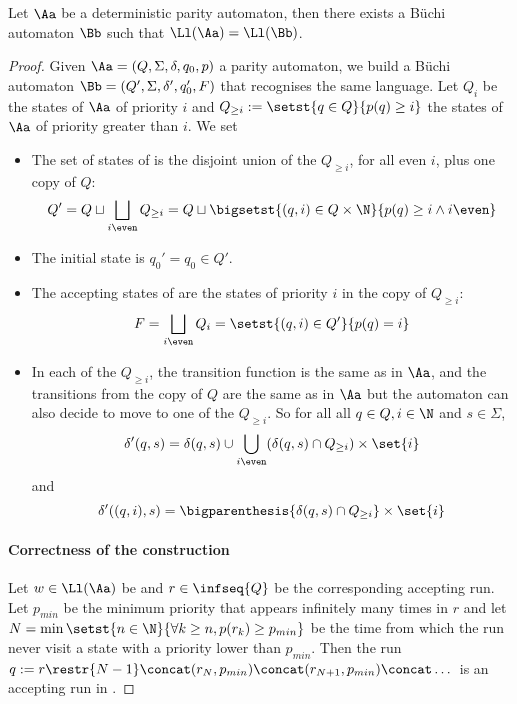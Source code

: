 \begin{lemma}
    Let $\Aa$ be a deterministic parity automaton,
    then there exists a Büchi automaton $\Bb$
    such that $\Ll(\Aa) = \Ll(\Bb)$.
\end{lemma}
\begin{proof}
    Given $\Aa = (Q, \Sigma, \delta, q_0, p)$ a parity automaton,
    we build a Büchi automaton $\Bb = (Q', \Sigma, \delta', q'_0, F)$ that recognises the same language.
    Let $Q_i$ be the states of $\Aa$ of priority $i$
    and $Q_{\geq i} := \setst{q \in Q}{p(q) \geq i}$ the states of $\Aa$ of priority greater than $i$.
    We set \begin{itemize}
        \item The set of states of \Bb is the disjoint union of the $Q_{\geq i}$, for all even $i$, plus one
        copy of $Q$: \[
                Q' = Q \sqcup \bigsqcup_{i \even} Q_{\geq i} =
                Q \sqcup \bigsetst{(q, i) \in Q \times \N}{p(q) \geq i \wedge i \even}
            \]
        \item The initial state is $q_0' = q_0 \in Q'$.
        \item The accepting states of \Bb are the states of priority $i$ in the copy of $Q_{\geq i}$:
        \[
            F = \bigsqcup_{i \even} Q_i = \setst{(q, i) \in Q'}{p(q) = i}
        \]
        \item In each of the $Q_{\geq i}$,
            the transition function is the same as in $\Aa$,
            and the transitions from the copy of $Q$ are the same as in $\Aa$ but
            the automaton can also decide to move to one of the $Q_{\geq i}$.
            So for all all $q \in Q, i \in \N$ and $s \in \Sigma$,
            \[
                \delta'(q, s) = \delta(q, s) \cup \bigcup_{i \even} (\delta(q, s) \cap Q_{\geq i})\times \set{i}
                \] and \[
                \delta'((q, i), s) = \bigparenthesis{\delta(q, s) \cap Q_{\geq i}} \times \set{i}
            \]
    \end{itemize}

    \paragraph*{Correctness of the construction} Let $w \in \Ll(\Aa)$ be and $r \in \infseq{Q}$
    be the corresponding accepting run. Let $p_{min}$ be the minimum priority
    that appears infinitely many times
    in $r$ and let $N = \min \setst{n \in \N}{\forall k \geq n, p(r_k) \geq p_{min}}$
    be the time from which the run never visit a state with a priority lower than $p_{min}$.
    Then the run $q := r\restr{N-1} \concat (r_N, p_{min}) \concat (r_{N+1}, p_{min}) \concat \dots$
    is an accepting run in \Bb.

\end{proof}

